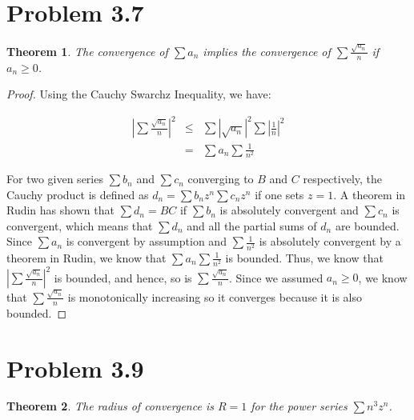 \documentclass[psamsfonts]{amsart}
\newtheorem{thm}{Theorem}[section]
\theoremstyle{definition}
\theoremstyle{remark}
\numberwithin{equation}{section}
\begin{document}
\section{Problem 3.7}

\begin{thm}
The convergence of $\sum a_n$ implies the convergence of $\sum \frac{\sqrt{a_n}}{n}$ if $a_n \geq 0 $.
\end{thm}

\begin{proof}

Using the Cauchy Swarchz Inequality, we have:

\begin{eqnarray}
\left| \sum \frac{\sqrt{a_n}}{n} \right|^2 &\leq& \sum |\sqrt{a_n}|^2 \sum \left|\frac{1}{n} \right|^2 \\
&=& \sum a_n \sum \frac{1}{n^2}
\end{eqnarray}

For two given series $\sum b_n$ and $\sum c_n$ converging to $B$ and $C$ respectively, the Cauchy product is defined as $d_n = \sum b_n z^n \sum c_n z^n$ if one sets $z = 1$. A theorem in Rudin has shown that $\sum d_n = BC$ if $\sum b_n$ is absolutely convergent and $\sum c_n$ is convergent, which means that $\sum d_n$ and all the partial sums of $d_n$ are bounded. Since $\sum a_n$ is convergent by assumption and $\sum \frac{1}{n^2}$ is absolutely convergent by a theorem in Rudin, we know that $\sum a_n \sum \frac{1}{n^2}$ is bounded. Thus, we know that $\left| \sum \frac{\sqrt{a_n}}{n} \right|^2 $ is bounded, and hence, so is $\sum \frac{\sqrt{a_n}}{n}$. Since we assumed $a_n \geq 0$, we know that $\sum \frac{\sqrt{a_n}}{n}$ is monotonically increasing so it converges because it is also bounded.
\end{proof}

\section{Problem 3.9}

\begin{thm}
The radius of convergence is $R = 1$ for the power series $\sum n^3 z^n$. 
\end{thm}
\end{document}
